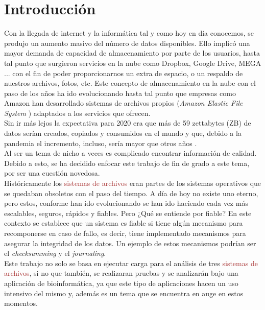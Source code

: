 \cleardoublepage
\clearpage{}

\chapter{Introducción}
Con la llegada de internet y la informática tal y como hoy en día conocemos, se produjo un aumento masivo del número de datos disponibles. Ello implicó una mayor demanda de capacidad de almacenamiento por parte de los usuarios, hasta tal punto que surgieron servicios en la nube como Dropbox, Google Drive, MEGA ... con el fin de poder proporcionarnos un extra de espacio, o un respaldo de nuestros archivos, fotos, etc. Este concepto de almacenamiento en la nube con el paso de los años ha ido evolucionando hasta tal punto que empresas como Amazon han desarrollado sistemas de archivos propios (\textit{Amazon Elastic File System} \cite{amazon})  adaptados a los servicios que ofrecen.\\
 

Sin ir más lejos la expectativa para 2020 era que más de 59 zettabytes (ZB) de datos serían creados, copiados y consumidos en el mundo y que, debido a la pandemia el incremento, incluso, sería mayor que otros años \cite{icb}. \\



Al ser un tema de nicho a veces es complicado encontrar información de calidad. Debido a esto, se ha decidido enfocar este trabajo de fin de grado a este tema, por ser una cuestión novedosa.\\


Históricamente los \textcolor{brown}{sistemas de archivos} eran partes de los sistemas operativos que se quedaban obsoletos con el paso del tiempo. A día de hoy no existe uno eterno, pero estos, conforme han ido evolucionando se han ido haciendo cada vez más escalables, seguros, rápidos y fiables. Pero ¿Qué se entiende por fiable? En este contexto se establece que un sistema es fiable si tiene algún mecanismo para recomponerse en caso de fallo, es decir, tiene implementado mecanismos para asegurar la integridad de los datos. Un ejemplo de estos mecanismos podrían ser el \textit{checksumming} y el \textit{journaling}.\\

Este trabajo no solo se basa en ejecutar carga para el análisis de tres \textcolor{brown}{sistemas de archivos}, si no que también, se realizaran pruebas y se analizarán bajo una aplicación de bioinformática, ya que este tipo de aplicaciones hacen un uso intensivo del mismo y, además es un tema que se encuentra en auge en estos momentos.


